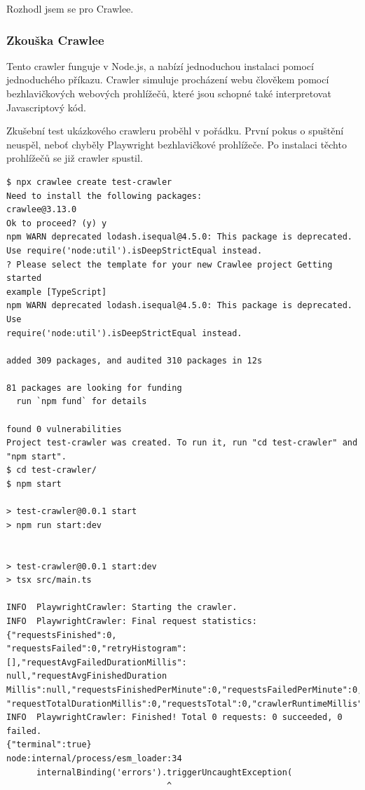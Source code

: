 Rozhodl jsem se pro Crawlee.

\subsubsection{Zkouška Crawlee}

Tento crawler funguje v Node.js, a nabízí jednoduchou instalaci pomocí
jednoduchého příkazu. Crawler simuluje procházení webu člověkem pomocí
bezhlavičkových webových prohlížečů, které jsou schopné také interpretovat
Javascriptový kód.

Zkušební test ukázkového crawleru proběhl v pořádku.
První pokus o spuštění neuspěl, neboť chyběly Playwright bezhlavičkové
prohlížeče. Po instalaci těchto prohlížečů se již crawler spustil.

\begin{verbatim}
$ npx crawlee create test-crawler
Need to install the following packages:
crawlee@3.13.0
Ok to proceed? (y) y
npm WARN deprecated lodash.isequal@4.5.0: This package is deprecated.
Use require('node:util').isDeepStrictEqual instead.
? Please select the template for your new Crawlee project Getting started
example [TypeScript]
npm WARN deprecated lodash.isequal@4.5.0: This package is deprecated. Use
require('node:util').isDeepStrictEqual instead.

added 309 packages, and audited 310 packages in 12s

81 packages are looking for funding
  run `npm fund` for details

found 0 vulnerabilities
Project test-crawler was created. To run it, run "cd test-crawler" and
"npm start".
$ cd test-crawler/
$ npm start

> test-crawler@0.0.1 start
> npm run start:dev


> test-crawler@0.0.1 start:dev
> tsx src/main.ts

INFO  PlaywrightCrawler: Starting the crawler.
INFO  PlaywrightCrawler: Final request statistics: {"requestsFinished":0,
"requestsFailed":0,"retryHistogram":[],"requestAvgFailedDurationMillis":
null,"requestAvgFinishedDuration
Millis":null,"requestsFinishedPerMinute":0,"requestsFailedPerMinute":0,
"requestTotalDurationMillis":0,"requestsTotal":0,"crawlerRuntimeMillis":685}
INFO  PlaywrightCrawler: Finished! Total 0 requests: 0 succeeded, 0 failed.
{"terminal":true}
node:internal/process/esm_loader:34
      internalBinding('errors').triggerUncaughtException(
                                ^


\end{verbatim}
